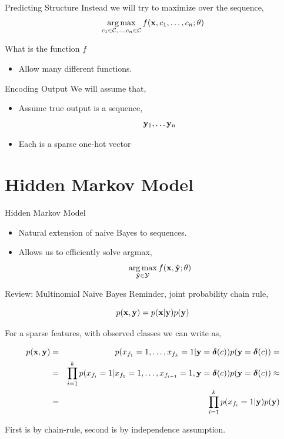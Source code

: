 \documentclass{beamer}
\begin{document}
\begin{frame}{Predicting Structure}
  Instead we will try to maximize over the sequence,
  \[ \argmax_{c_1 \in \mcC, \ldots, c_n\in \mcC} f(\boldx, c_1, \ldots, c_n; \theta)\]
\end{frame}


\begin{frame}{What is the function $f$}
  \begin{itemize}
  \item Allow many different functions.
  \end{itemize}
\end{frame}

\begin{frame}{Encoding Output}
  We will assume that,
  \begin{itemize}
  \item Assume true output is a sequence,
    \[ \mathbf{y}_1, \ldots \mathbf{y}_n\] 
    \air
  \item Each is a sparse one-hot vector
  \end{itemize}
\end{frame}

\section{Hidden Markov Model}

\begin{frame}{Hidden Markov Model}
  \begin{itemize}
  \item Natural extension of naive Bayes to sequences.
    \air 
  \item Allows us to efficiently solve argmax,
    \[ \argmax_{\hat{\boldy} \in \mcY} f(\boldx, \hat{\boldy}; \theta)\]
  \end{itemize}
\end{frame}

\begin{frame}{Review: Multinomial Naive Bayes } 
  Reminder, joint probability chain rule,  

  \[ p(\mathbf{x}, \mathbf{y}) = p(\mathbf{x} | \mathbf{y}) p(\mathbf{y}) \] 


    \pause
  For a sparse features, with observed classes we can write as,
  
  \begin{eqnarray*}
    p(\mathbf{x}, \mathbf{y}) &=& p(x_{f_1}=1, \ldots, x_{f_k}=1 | \mathbf{y}=\boldsymbol{\delta}(c) ) p(\mathbf{y}=\boldsymbol{\delta}(c)) =\\
     &=& \prod_{i=1}^k p(x_{f_i}=1 | x_{f_1}=1, \ldots, x_{f_{i-1}}=1, \mathbf{y}=\boldsymbol{\delta}(c)) p(\mathbf{y}=\boldsymbol{\delta}(c)) \approx \\
     &=& \prod_{i=1}^k p(x_{f_i} =1| \mathbf{y}) p(\mathbf{y})  
  \end{eqnarray*}

  
  First is by chain-rule, second is by independence assumption.
\end{frame}
\end{document}
